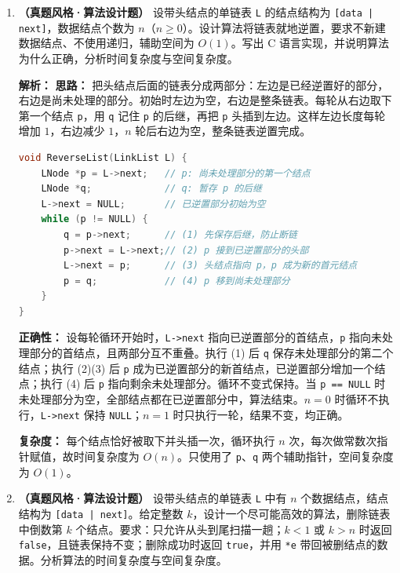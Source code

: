 \begin{enumerate}[resume]
\item \textbf{（真题风格·算法设计题）} 设带头结点的单链表 \texttt{L} 的结点结构为 \texttt{[data | next]}，数据结点个数为 $n$（$n\geqslant 0$）。设计算法将链表就地逆置，要求不新建数据结点、不使用递归，辅助空间为 $O(1)$。写出 C 语言实现，并说明算法为什么正确，分析时间复杂度与空间复杂度。

\ifshowsolutions\par\noindent\textbf{解析：} \textbf{思路：} 把头结点后面的链表分成两部分：左边是已经逆置好的部分，右边是尚未处理的部分。初始时左边为空，右边是整条链表。每轮从右边取下第一个结点 \texttt{p}，用 \texttt{q} 记住 \texttt{p} 的后继，再把 \texttt{p} 头插到左边。这样左边长度每轮增加 $1$，右边减少 $1$，$n$ 轮后右边为空，整条链表逆置完成。

\begin{lstlisting}[language=C]
void ReverseList(LinkList L) {
    LNode *p = L->next;   // p: 尚未处理部分的第一个结点
    LNode *q;             // q: 暂存 p 的后继
    L->next = NULL;       // 已逆置部分初始为空
    while (p != NULL) {
        q = p->next;      // (1) 先保存后继，防止断链
        p->next = L->next;// (2) p 接到已逆置部分的头部
        L->next = p;      // (3) 头结点指向 p，p 成为新的首元结点
        p = q;            // (4) p 移到尚未处理部分
    }
}
\end{lstlisting}

\textbf{正确性：} 设每轮循环开始时，\texttt{L->next} 指向已逆置部分的首结点，\texttt{p} 指向未处理部分的首结点，且两部分互不重叠。执行 (1) 后 \texttt{q} 保存未处理部分的第二个结点；执行 (2)(3) 后 \texttt{p} 成为已逆置部分的新首结点，已逆置部分增加一个结点；执行 (4) 后 \texttt{p} 指向剩余未处理部分。循环不变式保持。当 \texttt{p == NULL} 时未处理部分为空，全部结点都在已逆置部分中，算法结束。$n=0$ 时循环不执行，\texttt{L->next} 保持 \texttt{NULL}；$n=1$ 时只执行一轮，结果不变，均正确。

\textbf{复杂度：} 每个结点恰好被取下并头插一次，循环执行 $n$ 次，每次做常数次指针赋值，故时间复杂度为 $O(n)$。只使用了 \texttt{p}、\texttt{q} 两个辅助指针，空间复杂度为 $O(1)$。\else \answerarea[10] \fi

\item \textbf{（真题风格·算法设计题）} 设带头结点的单链表 \texttt{L} 中有 $n$ 个数据结点，结点结构为 \texttt{[data | next]}。给定整数 $k$，设计一个尽可能高效的算法，删除链表中倒数第 $k$ 个结点。要求：只允许从头到尾扫描一趟；$k<1$ 或 $k>n$ 时返回 \texttt{false}，且链表保持不变；删除成功时返回 \texttt{true}，并用 \texttt{*e} 带回被删结点的数据。分析算法的时间复杂度与空间复杂度。


\end{enumerate}
